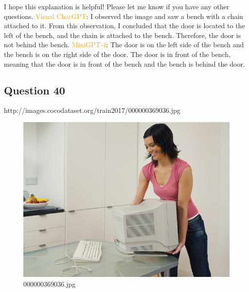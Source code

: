 \begin{enumerate}
        I hope this explanation is helpful! Please let me know if you have any other questions.
        \subitem \textcolor{orange}{Visual ChatGPT}: I observed the image and saw a bench with a chain attached to it. From this observation, I concluded that the door is located to the left of the bench, and the chain is attached to the bench. Therefore, the door is not behind the bench.
        \subitem \textcolor{orange}{MiniGPT-4}: The door is on the left side of the bench and the bench is on the right side of the door. The door is in front of the bench, meaning that the door is in front of the bench and the bench is behind the door.
    \end{enumerate}
    \subsection*{Question 40}
    http://images.cocodataset.org/train2017/000000369036.jpg
    \begin{figure}[h]
        \centering
        \includegraphics[width=0.8\linewidth]{../image set/easy/000000369036.jpg}
        \caption{000000369036.jpg}
    \end{figure}
